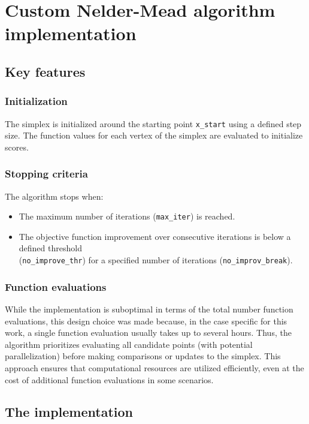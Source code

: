 \chapter{Custom Nelder-Mead algorithm implementation}\label{appendix C}

\section{Key features}

\subsection*{Initialization}
The simplex is initialized around the starting point \texttt{x\_start} using a defined step size. The function values for each vertex of the simplex are evaluated to initialize scores.

\subsection*{Stopping criteria}
The algorithm stops when:
\begin{itemize}
	\item The maximum number of iterations (\texttt{max\_iter}) is reached.
	\item The objective function improvement over consecutive iterations is below a defined threshold\\ (\texttt{no\_improve\_thr}) for a specified number of iterations (\texttt{no\_improv\_break}).
\end{itemize}

\subsection*{Function evaluations}
While the implementation is suboptimal in terms of the total number function evaluations, this design choice was made because, in the case specific for this work, a single function evaluation usually takes up to several hours. Thus, the algorithm prioritizes evaluating all candidate points (with potential parallelization) before making comparisons or updates to the simplex. This approach ensures that computational resources are utilized efficiently, even at the cost of additional function evaluations in some scenarios.

\section{The implementation}

